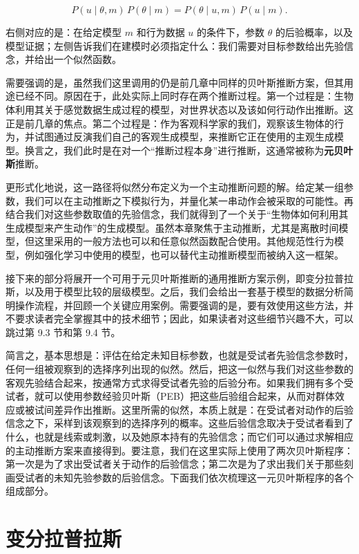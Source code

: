 \begin{equation}
P(u \mid \theta, m)\,P(\theta \mid m)=P(\theta \mid u,m)\,P(u \mid m).
\label{eq:chapter9-bayes}
\end{equation}

右侧对应的是：在给定模型 $m$ 和行为数据 $u$ 的条件下，参数 $\theta$ 的后验概率，以及模型证据；左侧告诉我们在建模时必须指定什么：我们需要对目标参数给出先验信念，并给出一个似然函数。

需要强调的是，虽然我们这里调用的仍是前几章中同样的贝叶斯推断方案，但其用途已经不同。原因在于，此处实际上同时存在两个推断过程。第一个过程是：生物体利用其关于感觉数据生成过程的模型，对世界状态以及该如何行动作出推断。这正是前几章的焦点。第二个过程是：作为客观科学家的我们，观察该生物体的行为，并试图通过反演我们自己的客观生成模型，来推断它正在使用的主观生成模型。换言之，我们此时是在对一个“推断过程本身”进行推断，这通常被称为\textbf{元贝叶斯}推断。

更形式化地说，这一路径将似然分布定义为一个主动推断问题的解。给定某一组参数，我们可以在主动推断之下模拟行为，并量化某一串动作会被采取的可能性。再结合我们对这些参数取值的先验信念，我们就得到了一个关于“生物体如何利用其生成模型来产生动作”的生成模型。虽然本章聚焦于主动推断，尤其是离散时间模型，但这里采用的一般方法也可以和任意似然函数配合使用。其他规范性行为模型，例如强化学习中使用的模型，也可以替代主动推断模型而被纳入这一框架。

接下来的部分将展开一个可用于元贝叶斯推断的通用推断方案示例，即变分拉普拉斯，以及用于模型比较的层级模型。之后，我们会给出一套基于模型的数据分析简明操作流程，并回顾一个关键应用案例。需要强调的是，要有效使用这些方法，并不要求读者完全掌握其中的技术细节；因此，如果读者对这些细节兴趣不大，可以跳过第 9.3 节和第 9.4 节。

简言之，基本思想是：评估在给定未知目标参数，也就是受试者先验信念参数时，任何一组被观察到的选择序列出现的似然。然后，把这一似然与我们对这些参数的客观先验结合起来，按通常方式求得受试者先验的后验分布。如果我们拥有多个受试者，就可以使用参数经验贝叶斯（PEB）把这些后验组合起来，从而对群体效应或被试间差异作出推断。这里所需的似然，本质上就是：在受试者对动作的后验信念之下，采样到该观察到的选择序列的概率。这些后验信念取决于受试者看到了什么，也就是线索或刺激，以及她原本持有的先验信念；而它们可以通过求解相应的主动推断方案来直接得到。要注意，我们在这里实际上使用了两次贝叶斯程序：第一次是为了求出受试者关于动作的后验信念；第二次是为了求出我们关于那些刻画受试者的未知先验参数的后验信念。下面我们依次梳理这一元贝叶斯程序的各个组成部分。

\section{变分拉普拉斯}

